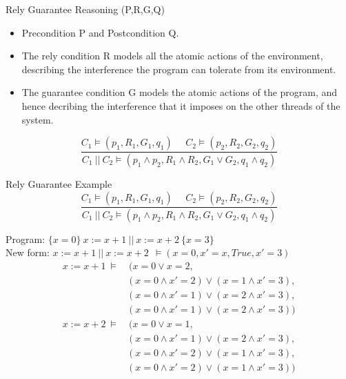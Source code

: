\documentclass[11pt]{beamer}
\begin{document}
\begin{frame}{Rely Guarantee Reasoning (P,R,G,Q)}
  \begin{itemize}
  \item Precondition P and Postcondition Q.
  \item The rely condition R models all the atomic actions of the environment,
    describing the interference the  program can tolerate from its environment.
  \item The guarantee condition G models the atomic actions of the program, and
    hence decribing the interference that it imposes on the other threads of the system.
  \end{itemize}
  \pause
  $$\frac{C_1 \models (p_1, R_1,G_1,q_1)~~~~~~ C_2 \models (p_2, R_2, G_2, q_2)}{C_1~||~C_2 \models (p_1 \land
    p_2, R_1 \land R_2, G_1 \lor G_2, q_1 \land q_2)}$$
\end{frame}

\begin{frame}{Rely Guarantee Example}
     $$\frac{C_1 \models (p_1, R_1,G_1,q_1)~~~~~~ C_2 \models (p_2, R_2, G_2, q_2)}{C_1~||~C_2 \models (p_1 \land
    p_2, R_1 \land R_2, G_1 \lor G_2, q_1 \land q_2)}$$
 
  Program: $\{x = 0\}~ x := x + 1 ~||~ x := x + 2 ~\{x = 3\}$ \\
  New form: $x := x + 1 ~||~ x := x + 2~~\models (x=0, x' = x, True, x' = 3)$ \\
 
    \pause
  \begin{equation}
    \begin{split}
      x := x + 1 ~\models &~(x = 0 \lor x = 2, \\
      &(x = 0 \land x' = 2) \lor (x = 1 \land x' = 3), \\
      &(x = 0 \land x'=1) \lor (x=2 \land x' = 3), \\
      &(x = 0 \land x' = 1) \lor (x = 2 \land x' = 3)) \nonumber
  \end{split}
  \end{equation}
  \pause
  \begin{equation}
    \begin{split}
      x := x + 2 ~\models &~(x = 0 \lor x = 1, \\
      &(x = 0 \land x' = 1) \lor (x = 2 \land x' = 3), \\
      &(x = 0 \land x'= 2) \lor (x=1 \land x' = 3), \\
      &(x = 0 \land x' = 2) \lor (x = 1 \land x' = 3)) \nonumber
  \end{split}
  \end{equation}
\end{frame}
\end{document}
